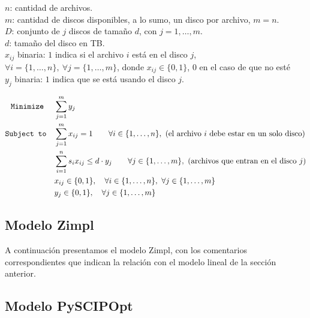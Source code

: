 \documentclass[11pt, a4paper, pdftex]{article}
\begin{document}
$n$: cantidad de archivos. \\

$m$: cantidad de discos disponibles, a lo sumo, un disco por archivo, $m = n$. \\

$D$: conjunto de $j$ discos de tamaño $d$, con $j = 1, \ldots, m$. \\

$d$: tamaño del disco en TB. \\ 

$x_{ij}$ binaria: $1$ indica si el archivo $i$ está en el disco $j$, $\forall i = \{1, \ldots, n\},\ \forall j = \{1, \ldots, m\}$, donde $x_{ij} \in \{0, 1\}$, $0$ en el caso de que no esté\\

$y_{j}$ binaria: $1$ indica que se está usando el disco $j$.

\begin{alignat*}{2}
	\texttt{Minimize}\quad\,\,
	& \sum_{j = 1}^{m} y_{j}\\
	\texttt{Subject to}\quad
	& \sum_{j = 1}^{m} x_{ij} = 1 \qquad \forall i \in \{1, \ldots, n\},\ \text{(el archivo $i$ debe estar en un solo disco)}\\
	& \sum_{i = 1}^{n} s_{i} x_{ij} \le d\cdot y_{j} \qquad \forall j \in \{1, \ldots, m\},\ \text{(archivos que entran en el disco $j$)}\\
	& x_{ij} \in \{0,1\}, \quad \forall i \in \{1, \ldots, n\}, \ \forall j \in \{1, \ldots, m\}\\
	& y_{j} \in \{0,1\}, \quad \forall j \in \{1, \ldots, m\}
\end{alignat*}

\subsection{Modelo Zimpl}

A continuación presentamos el modelo Zimpl, con los comentarios
correspondientes que indican la relación con el modelo lineal de la sección
anterior.



\newpage
\subsection{Modelo PySCIPOpt}
\end{document}

